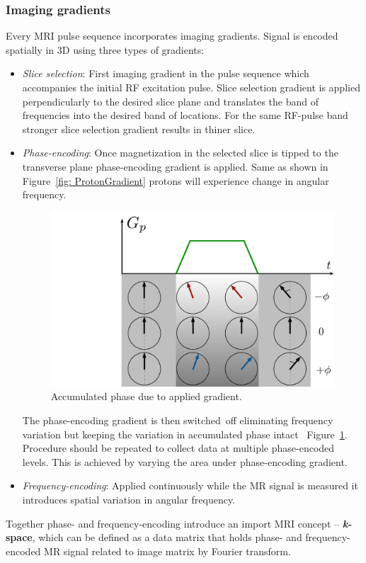 \subsubsection{Imaging gradients}
Every MRI pulse sequence incorporates imaging gradients. 
Signal is encoded spatially in 3D using three types of gradients:
\begin{itemize}
	\item \textit{Slice selection}: First imaging gradient in the pulse sequence which accompanies the initial RF excitation pulse. Slice selection gradient is applied perpendicularly to the desired slice plane and translates the band of frequencies into the desired band of locations. For the same RF-pulse band stronger slice selection gradient results in thiner slice.
	\item \textit{Phase-encoding}: Once magnetization in the selected slice is tipped to the transverse plane phase-encoding gradient is applied. Same as shown in Figure~\ref{fig: ProtonGradient} protons will experience change in angular frequency. 
\begin{figure}[!htb]
\vspace{+0.2cm}
\centering
\includegraphics[scale=.45]{Figures/PhaseEncode.pdf}
\caption[Accumulated phase due to applied gradient]{Accumulated phase due to applied gradient.}
\label{fig: PhaseEncode}
\end{figure}
	The phase-encoding gradient is then switched~off eliminating frequency variation but keeping the variation in accumulated phase intact~ Figure~\ref{fig: PhaseEncode}. Procedure should be repeated to collect data at multiple phase-encoded levels. This is achieved by varying the area under phase-encoding gradient.
	\item \textit{Frequency-encoding}: Applied continuously while the MR signal is measured it introduces spatial variation in angular frequency.\end{itemize}
Together phase- and frequency-encoding introduce an import MRI concept -- \textbf{\mbox{\textit{k-}space}}, which can be defined as a data matrix that holds phase- and frequency-encoded MR signal related to image matrix by Fourier transform.

